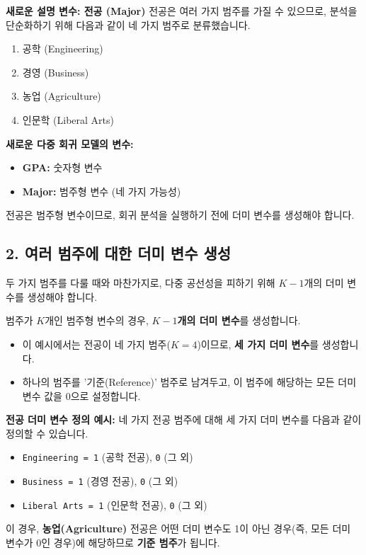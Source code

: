 \documentclass[11pt,a4paper]{article}
\begin{document}
\textbf{새로운 설명 변수: 전공 (Major)}
전공은 여러 가지 범주를 가질 수 있으므로, 분석을 단순화하기 위해 다음과 같이 네 가지 범주로 분류했습니다.
\begin{enumerate}
    \item 공학 (Engineering)
    \item 경영 (Business)
    \item 농업 (Agriculture)
    \item 인문학 (Liberal Arts)
\end{enumerate}

\textbf{새로운 다중 회귀 모델의 변수:}
\begin{itemize}
    \item \textbf{GPA:} 숫자형 변수
    \item \textbf{Major:} 범주형 변수 (네 가지 가능성)
\end{itemize}
전공은 범주형 변수이므로, 회귀 분석을 실행하기 전에 더미 변수를 생성해야 합니다.

\subsection*{2. 여러 범주에 대한 더미 변수 생성}
두 가지 범주를 다룰 때와 마찬가지로, 다중 공선성을 피하기 위해 $K-1$개의 더미 변수를 생성해야 합니다.

\begin{tcolorbox}[title=더미 변수 생성 규칙 (여러 범주)]
범주가 $K$개인 범주형 변수의 경우, \textbf{$K-1$개의 더미 변수}를 생성합니다.
\begin{itemize}
    \item 이 예시에서는 전공이 네 가지 범주($K=4$)이므로, \textbf{세 가지 더미 변수}를 생성합니다.
    \item 하나의 범주를 '기준(Reference)' 범주로 남겨두고, 이 범주에 해당하는 모든 더미 변수 값을 0으로 설정합니다.
\end{itemize}
\end{tcolorbox}

\textbf{전공 더미 변수 정의 예시:}
네 가지 전공 범주에 대해 세 가지 더미 변수를 다음과 같이 정의할 수 있습니다.
\begin{itemize}
    \item \texttt{Engineering = 1} (공학 전공), \texttt{0} (그 외)
    \item \texttt{Business = 1} (경영 전공), \texttt{0} (그 외)
    \item \texttt{Liberal Arts = 1} (인문학 전공), \texttt{0} (그 외)
\end{itemize}
이 경우, \textbf{농업(Agriculture)} 전공은 어떤 더미 변수도 1이 아닌 경우(즉, 모든 더미 변수가 0인 경우)에 해당하므로 \textbf{기준 범주}가 됩니다.
\end{document}
